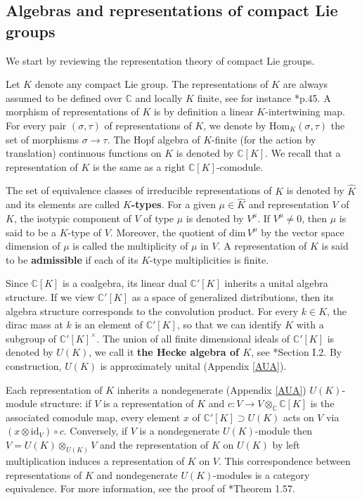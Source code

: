 \documentclass{amsart}
\theoremstyle{definition}
\begin{document}
\subsection{Algebras and representations of compact Lie groups}\label{compactgroups} We start by reviewing the representation theory of compact Lie groups.

Let $K$ denote any compact Lie group. The representations of $K$ are always assumed to be defined over $\mathbb{C}$ and locally $K$ finite, see for instance \cite{KnappVogan}*{p.45}. A morphism of representations of $K$ is by definition a linear $K$-intertwining map. For every pair $(\sigma,\tau)$ of representations of $K$, we denote by $\mathrm{Hom}_K(\sigma,\tau)$ the set of morphisms $\sigma \to \tau$. The Hopf algebra of $K$-finite (for the action by translation) continuous functions on $K$ is denoted by $\mathbb{C}[K]$. We recall that a representation of $K$ is the same as a right $\mathbb{C}[K]$-comodule.

The set of equivalence classes of irreducible representations of $K$ is denoted by $\widehat{K}$ and its elements are called \textbf{$K$-types}. For a given $\mu \in \widehat{K}$ and representation $V$ of $K$, the isotypic component of $V$ of type $\mu$ is denoted by $V^\mu$. If $V^\mu \neq 0$, then $\mu$ is said to be a $K$-type of $V$. Moreover, the quotient of $\mathrm{dim} \,V^\mu$ by the vector space dimension of $\mu$ is called the multiplicity of $\mu$ in $V$. A representation of $K$ is said to be \textbf{admissible} if each of its $K$-type multiplicities is finite.

Since $\mathbb{C}[K]$ is a coalgebra, its linear dual $\mathbb{C}'[K]$ inherits a unital algebra structure. If we view $\mathbb{C}'[K]$ as a space of generalized distributions, then its algebra structure corresponds to the convolution product. For every $k \in K$, the dirac mass at $k$ is an element of $\mathbb{C}'[K]$, so that we can identify $K$ with a subgroup of $\mathbb{C}'[K]^\times$. The union of all finite dimensional ideals of $\mathbb{C}'[K]$ is denoted by $U(K)$, we call it \textbf{the Hecke algebra of $K$}, see \cite{KnappVogan}*{Section I.2}. By construction, $U(K)$ is approximately unital (Appendix \ref{AUA}).

Each representation of $K$ inherits a nondegenerate (Appendix \ref{AUA}) $U(K)$-module structure: if $V$ is a representation of $K$ and $c : V \to  V\otimes_\mathbb{C}\mathbb{C}[K]$ is the associated comodule map, every element $x$ of $\mathbb{C}'[K]\supset U(K)$ acts on $V$ via $(x \otimes \mathrm{id}_V)\circ c$. Conversely, if $V$ is a nondegenerate $U(K)$-module then $V = U(K) \otimes_{U(K)} V$ and the representation of $K$ on $U(K)$ by left multiplication induces a representation of $K$ on $V$. This correspondence between representations of $K$ and nondegenerate $U(K)$-modules is a category equivalence. For more information, see the proof of \cite{KnappVogan}*{Theorem 1.57}.
\end{document}
